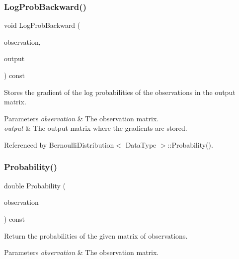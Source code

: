 \subsubsection{Log\+Prob\+Backward()}
{\footnotesize\ttfamily void Log\+Prob\+Backward (\begin{DoxyParamCaption}\item[{const Data\+Type \&}]{observation,  }\item[{Data\+Type \&}]{output }\end{DoxyParamCaption}) const}



Stores the gradient of the log probabilities of the observations in the output matrix. 


\begin{DoxyParams}{Parameters}
{\em observation} & The observation matrix. \\
\hline
{\em output} & The output matrix where the gradients are stored. \\
\hline
\end{DoxyParams}


Referenced by Bernoulli\+Distribution$<$ Data\+Type $>$\+::\+Probability().

\mbox{\label{classmlpack_1_1ann_1_1BernoulliDistribution_a5d5f71a6aaf6e56c1b5cce0bee23103f}} 
\subsubsection{Probability()\hspace{0.1cm}{\footnotesize\ttfamily [1/3]}}
{\footnotesize\ttfamily double Probability (\begin{DoxyParamCaption}\item[{const Data\+Type \&}]{observation }\end{DoxyParamCaption}) const\hspace{0.3cm}{\ttfamily [inline]}}



Return the probabilities of the given matrix of observations. 


\begin{DoxyParams}{Parameters}
{\em observation} & The observation matrix. \\
\hline
\end{DoxyParams}


